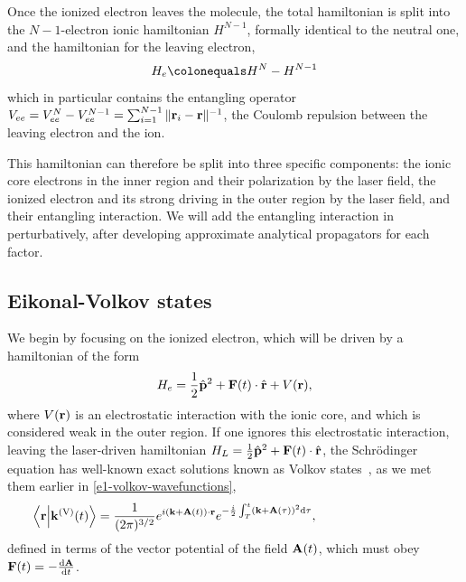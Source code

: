 Once the ionized electron leaves the molecule, the total hamiltonian is split into the $N-1$-electron ionic hamiltonian $H^{N-1}$, formally identical to the neutral one, and the hamiltonian for the leaving electron,
\begin{equation}
H_e\colonequals H^N-H^{N-1}
\end{equation}
which in particular contains the entangling operator $V_{ee}=V_{ee}^N-V_{ee}^{N-1}=\sum_{i=1}^{N-1}\|\vb{r}_i-\vb{r}\|^{-1}$, the Coulomb repulsion between the leaving electron and the ion. 

This hamiltonian can therefore be split into three specific components: the ionic core electrons in the inner region and their polarization by the laser field, the ionized electron and its strong driving in the outer region by the laser field, and their entangling interaction. We will add the entangling interaction in perturbatively, after developing approximate analytical propagators for each factor.



\subsection{Eikonal-Volkov states}
We begin by focusing on the ionized electron, which will be driven by a hamiltonian of the form
\begin{equation}
H_e=\frac12 \hat{\vb{p}}^2 + \vb{F}(t)\cdot\hat{\vb{r}} + V(\vb{r}),
\label{e2-single-electron-hamiltonian}
\end{equation}
where $V(\vb{r})$ is an electrostatic interaction with the ionic core, and which is considered weak in the outer region. If one ignores this electrostatic interaction, leaving the laser-driven hamiltonian $H_L=\frac12 \hat{\vb{p}}^2 + \vb{F}(t)\cdot \hat{\vb{r}}$, the Schrödinger equation has well-known exact solutions known as Volkov states~\cite{ bergou_volkov_sates_1980}, as we met them earlier in \eqref{e1-volkov-wavefunctions},
\begin{align}
\phantom{{}^\mathrm{EA}}
\braket{\vb{r}}{\vb{k}^{\mathrm{(V)}}(t)}
& = 
\frac{1}{(2\pi)^{3/2}}
e^{i\left(\vb{k}+\vba(t)\right)\cdot\vb{r}} 
e^{-\frac{i}{2} \int_T^t\left(\vb{k}+\vba(\tau)\right)^2\d\tau},
\phantom{e^{-i\int_T^t U_n(\rl(\tau;\vb{r},\vb{k},t),\tau)\d\tau}}
\label{e2-volkov-wavefunctions}
\end{align}
defined in terms of the vector potential of the field $\vb{A}(t)$, which must obey $\vb{F}(t) = -\frac{\mathrm{d}\vb{A}}{\mathrm{d} t}$.

